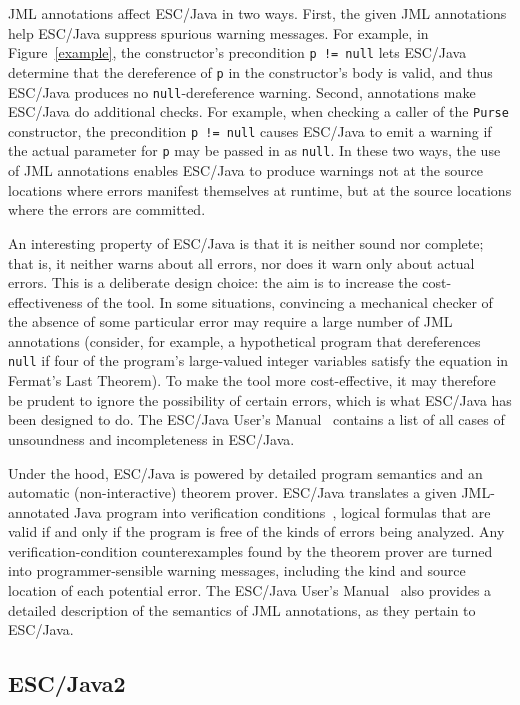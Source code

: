 JML annotations affect ESC/Java in two ways.  First, the given JML
annotations help ESC/Java suppress spurious warning messages.  For
example, in Figure~\ref{example}, the constructor's
precondition \texttt{p != null} lets ESC/Java determine that the
dereference of \texttt{p} in the constructor's body is valid, and thus
ESC/\-Java produces no \texttt{null}-dereference warning.  Second,
annotations make ESC/\-Java do additional checks.  For example,
when checking a caller of the \texttt{Purse} constructor, the
precondition \texttt{p != null} causes ESC/Java to emit a warning if
the actual parameter for \texttt{p} may be passed in as \texttt{null}.
In these two ways, the use of JML annotations enables ESC/Java to
produce warnings not at the source locations where errors manifest
themselves at runtime, but at the source locations where the errors
are committed.

An interesting property of ESC/Java is that it is neither sound nor
complete; that is, it neither warns about all errors, nor does it
warn only about actual errors.  This is a deliberate design choice:
the aim is to increase the cost-effectiveness of the tool.  In some
situations, convincing a mechanical checker of the absence of some
particular error may require a large number of JML annotations
(consider, for example, a hypothetical program that dereferences
\texttt{null} if four of the program's large-valued integer variables
satisfy the equation in Fermat's Last Theorem).  To make the tool more
cost-effective, it may therefore be prudent to ignore the possibility
of certain errors, which is what ESC/Java has been designed to do.
The ESC/Java User's Manual~\cite{escjava:userman} contains a list of
all cases of unsoundness and incompleteness in ESC/Java.

Under the hood, ESC/Java is powered by detailed program semantics and
an automatic (non-interactive) theorem prover.  ESC/Java translates a
given JML-an\-no\-tat\-ed Java program into verification
conditions~\cite{LeinoSaxeStata:JavaViaGC,FlanaganSaxe:POPL01},
logical formulas that are valid if and only if the program is free of
the kinds of errors being analyzed.  Any verification-condition
counterexamples found by the theorem prover are turned into
programmer-sensible warning messages, including the kind and source
location of each potential error.  The ESC/Java User's
Manual~\cite{escjava:userman} also provides a detailed description of
the semantics of JML annotations, as they pertain to ESC/Java.

\subsection{ESC/Java2}
\label{escjava2}

